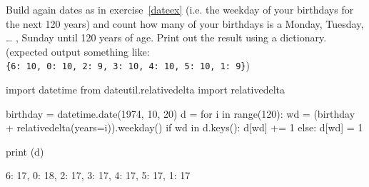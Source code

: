 \begin{question}
Build again dates as in exercise~\ref{dateex} (i.e. the weekday of your birthdays for the next 120 years) and count how many of your birthdays is a Monday, Tuesday, \ldots{} , Sunday until 120 years of age. Print out the result using a dictionary. (expected output something like: \texttt{\{6:\ 10,\ 0:\ 10,\ 2:\ 9,\ 3:\ 10,\ 4:\ 10,\ 5:\ 10,\ 1:\ 9\}})
\end{question}

\cprotEnv\begin{solution}
\begin{ipython}
import datetime
from dateutil.relativedelta import relativedelta

birthday = datetime.date(1974, 10, 20)
d = {}
for i in range(120):
    wd = (birthday + relativedelta(years=i)).weekday() 
    if wd in d.keys():
        d[wd] += 1
    else:
        d[wd] = 1
        
print (d)

{6: 17, 0: 18, 2: 17, 3: 17, 4: 17, 5: 17, 1: 17}
\end{ipython}
\end{solution}

